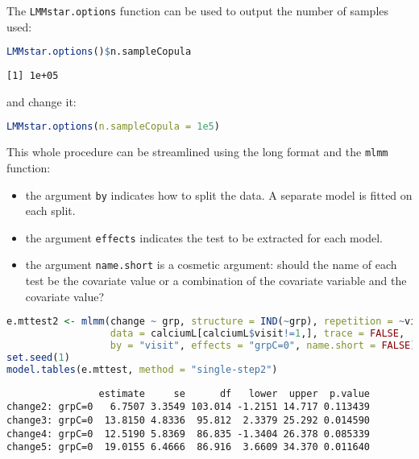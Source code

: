 \documentclass[12pt]{article}
\begin{document}
\hspace{-5mm}\begin{minipage}[t]{0.5\linewidth}
The \texttt{LMMstar.options} function can be used \newline
to output the number of samples used:
\begin{lstlisting}[language=r,numbers=none]
LMMstar.options()$n.sampleCopula
\end{lstlisting}

\label{}
\begin{verbatim}
[1] 1e+05
\end{verbatim}


\end{minipage}
\begin{minipage}[t]{0.45\linewidth}
\hphantom{x} \newline and change it:
\begin{lstlisting}[language=r,numbers=none]
LMMstar.options(n.sampleCopula = 1e5)
\end{lstlisting}
\end{minipage}

\bigskip

This whole procedure can be streamlined using the long format and the
\texttt{mlmm} function:
\begin{itemize}
\item the argument \texttt{by} indicates how to split the data. A separate model
is fitted on each split.
\item the argument \texttt{effects} indicates the test to be extracted for each
model.
\item the argument \texttt{name.short} is a cosmetic argument: should the name of
each test be the covariate value or a combination of the covariate
variable and the covariate value?
\end{itemize}
\begin{lstlisting}[language=r,numbers=none]
e.mttest2 <- mlmm(change ~ grp, structure = IND(~grp), repetition = ~visit|girl,
                  data = calciumL[calciumL$visit!=1,], trace = FALSE,
                  by = "visit", effects = "grpC=0", name.short = FALSE)
set.seed(1)
model.tables(e.mttest, method = "single-step2")
\end{lstlisting}



\label{}
\begin{verbatim}
                estimate     se      df   lower  upper  p.value
change2: grpC=0   6.7507 3.3549 103.014 -1.2151 14.717 0.113439
change3: grpC=0  13.8150 4.8336  95.812  2.3379 25.292 0.014590
change4: grpC=0  12.5190 5.8369  86.835 -1.3404 26.378 0.085339
change5: grpC=0  19.0155 6.4666  86.916  3.6609 34.370 0.011640
\end{verbatim}
\end{document}
